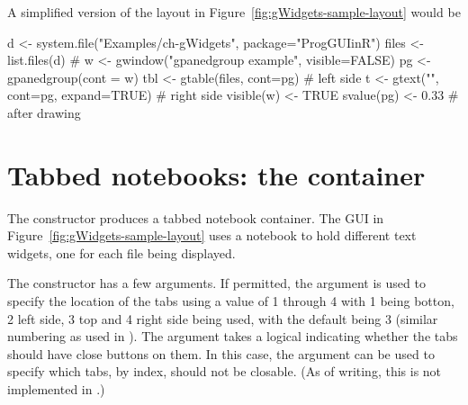 A simplified version of the layout in
Figure~\ref{fig:gWidgets-sample-layout} would be
\begin{Schunk}
\begin{Sinput}
 d <- system.file("Examples/ch-gWidgets", package="ProgGUIinR")
 files <- list.files(d)
 #
 w <- gwindow("gpanedgroup example", visible=FALSE)
 pg <- gpanedgroup(cont = w)
 tbl <- gtable(files, cont=pg)           # left side
 t <- gtext("", cont=pg, expand=TRUE)    # right side
 visible(w) <- TRUE
 svalue(pg) <- 0.33                      # after drawing
\end{Sinput}
\end{Schunk}




  
\section{Tabbed notebooks: the  container}
\label{sec:gWidgets-gnotebook}

The  constructor produces a tabbed notebook
container. The GUI in Figure~\ref{fig:gWidgets-sample-layout} uses a
notebook to hold different text widgets, one for each file being displayed.

The  constructor has a few arguments. If permitted, the
argument  is used to specify the location
of the tabs using a value of 1 through 4 with 1 being botton, 2 left
side, 3 top and 4 right side being used, with the default being 3
(similar numbering as used in ). The
 argument takes a logical indicating
whether the tabs should have close buttons on them. In this case, the
argument  can be used to specify
which tabs, by index, should not be closable. (As of writing, this is
not implemented in .)



